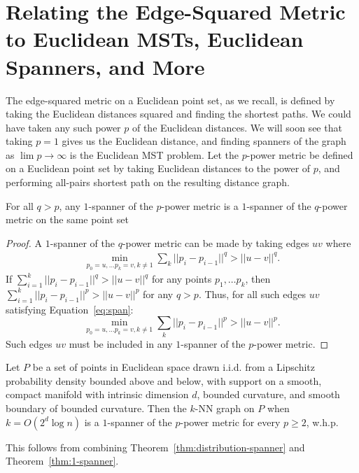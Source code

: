 \section{Relating the Edge-Squared Metric to Euclidean MSTs,
Euclidean Spanners, and More}\label{sec:edge-power}
The edge-squared metric on a Euclidean point set, as we recall, is defined by taking the
Euclidean distances squared and finding the shortest paths. 
We could have taken any such power $p$ of the Euclidean distances. We
will soon see that taking $p = 1$ gives us the Euclidean distance, and
finding spanners of the graph as $\lim p\rightarrow \infty$ is the
Euclidean MST problem.  
Let the $p$-power metric be defined on a Euclidean point set by taking
Euclidean distances to the power of $p$, and performing all-pairs
shortest path on the resulting distance graph.
\begin{theorem} \label{thm:1-spanner}
For all $q > p$, any $1$-spanner of the $p$-power metric is a
$1$-spanner of the $q$-power metric on the same point set
\end{theorem}
\begin{proof}
A $1$-spanner of the $q$-power metric can be made by taking
  edges $uv$ where
  \begin{align}\label{eq:span}
    \min_{p_0=u, \ldots p_k=v, k \not= 1} \sum_k ||p_i - p_{i-1}||^q > || u -
v||^q.
  \end{align}
If
  $\sum_{i=1}^k ||p_i - p_{i-1}||^q > || u - v||^q$ for any points
  $p_1, \ldots p_k$, then
  $\sum_{i=1}^k ||p_i - p_{i-1}||^p > || u - v||^p$ for any $q > p$.
  Thus, for all such edges $uv$ satisfying
  Equation~\ref{eq:span}:
  \[ \min_{p_0=u, \ldots p_k=v, k \not= 1} \sum_k ||p_i - p_{i-1}||^p > || u -
  v||^p. \] Such edges $uv$ must be included in any $1$-spanner
  of the $p$-power
  metric.
\end{proof}

 \begin{corollary}
   Let $P$ be a set of points in Euclidean space drawn i.i.d. from a Lipschitz
   probability density bounded above and below, with support on a
   smooth, compact manifold with intrinsic dimension $d$, bounded
   curvature, and
   smooth boundary of bounded curvature. Then the $k$-NN graph on $P$
   when $k = O(2^d \log n)$ is a $1$-spanner of the $p$-power
   metric for every $p \geq 2$, w.h.p.
 \end{corollary}
This follows from combining Theorem~\ref{thm:distribution-spanner} and
Theorem~\ref{thm:1-spanner}.
